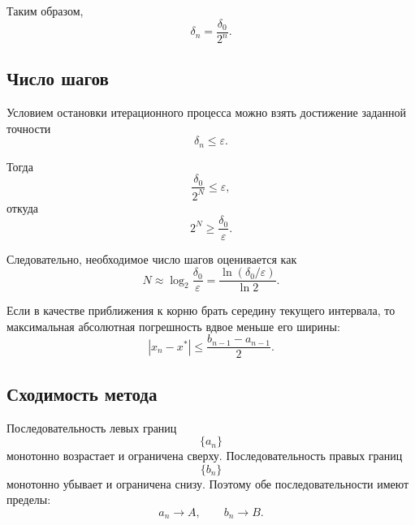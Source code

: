 \documentclass[../final.tex]{subfiles}
\begin{document}
Таким образом,
%
\begin{equation*}
    \delta_n
    =
    \frac{\delta_0}{2^n}.
\end{equation*}


\subsection{Число шагов}

Условием остановки итерационного процесса можно взять достижение
заданной точности
%
\begin{equation*}
    \delta_n\leq\varepsilon.
\end{equation*}

Тогда
%
\begin{equation*}
    \frac{\delta_0}{2^N}\leq\varepsilon,
\end{equation*}
%
откуда
%
\begin{equation*}
    2^N\geq\frac{\delta_0}{\varepsilon}.
\end{equation*}

Следовательно, необходимое число шагов оценивается как
%
\begin{equation*}
    N
    \approx
    \log_2\frac{\delta_0}{\varepsilon}
    =
    \frac{\ln(\delta_0/\varepsilon)}{\ln2}.
\end{equation*}

Если в качестве приближения к корню брать середину текущего
интервала, то максимальная абсолютная погрешность вдвое меньше его
ширины:
%
\begin{equation*}
    \left|x_n-x^*\right|
    \leq
    \frac{b_{n-1}-a_{n-1}}{2}.
\end{equation*}


\subsection{Сходимость метода}

Последовательность левых границ
%
\begin{equation*}
    \{a_n\}
\end{equation*}
%
монотонно возрастает и ограничена сверху. Последовательность правых
границ
%
\begin{equation*}
    \{b_n\}
\end{equation*}
%
монотонно убывает и ограничена снизу. Поэтому обе
последовательности имеют пределы:
%
\begin{equation*}
    a_n\to A,
    \qquad
    b_n\to B.
\end{equation*}
\end{document}
